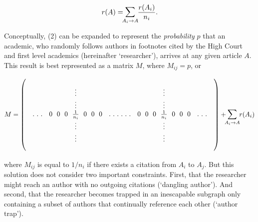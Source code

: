 \begin{equation}
r(A) = \mathlarger{\sum}_{\mathclap{A_i \rightarrow A}} \ \frac{r(A_i)}{n_i}.
\end{equation}

Conceptually, (2) can be expanded to represent the \emph{probability} $p$ that an academic, who randomly follows authors in footnotes cited by the High Court and first level academics (hereinafter `researcher'), arrives at any given article $A$. This result is best represented as a matrix $M$, where $M_{ij} = p$, or

\[
M = 
\begin{pmatrix}
&             &                                         &                          &                                        &             & \\
&             &  \vdots                                 &                          &   \vdots                               &             & \\
&             &  \vdots                                 &                          &   \vdots                               &             & \\
& . \ . \ .   &  0 \ \ 0 \ \ 0 \ \ \frac{1}{n_i} \ \ 0 \ \ 0 \ \ 0 & . \ . \ . \  . \ . \ .   & 0 \ \ 0 \ \ 0 \ \ \frac{1}{n_i} \ \ 0 \ \ 0 \ \ 0 & . \ . \ .   & \\
&             &  \vdots                                 &                          &   \vdots                               &             & \\
&             &  \vdots                                 &                          &   \vdots                               &             & \\
&             &                                         &                          &                                        &             & \\
\end{pmatrix} + \mathlarger{\sum}_{\mathclap{A_i \rightarrow A}} \ r(A_i)
\]

where $M_{ij}$ is equal to $1/n_i$ if there exists a citation from $A_i$ to $A_j$. But this solution does not consider two important constraints. First, that the researcher might reach an author with no outgoing citations (`dangling author'). And second, that the researcher becomes trapped in an inescapable subgraph only containing a subset of authors that continually reference each other (`author trap').

